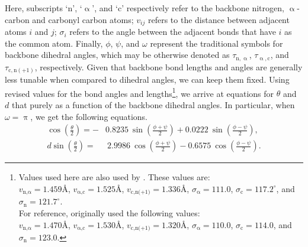 \documentclass[fleqn,10pt]{wlpeerj} %
\begin{document}
Here, subscripts `$\textrm{n}$', `$\upalpha$', and `$\textrm{c}$' respectively refer to the backbone nitrogen, $\upalpha$-carbon and carbonyl carbon atoms; $v_{ij}$ refers to the distance between adjacent atoms $i$ and $j$; $\sigma_i$ refers to the angle between the adjacent bonds that have $i$ as the common atom. Finally, $\phi$, $\psi$, and $\omega$ represent the traditional  symbols for backbone dihedral angles, which may be otherwise denoted as $\tau_{\textrm{n},\upalpha}$, $\tau_{\upalpha,\textrm{c}}$, and $\tau_{\textrm{c},\textrm{n}(+1)}$, respectively. Given that backbone bond lengths and angles are generally less tunable when compared to dihedral angles, we can keep them fixed. Using revised values for the bond angles and lengths\footnote{Values used here are also used by \cite{Zacharias2013}. These values are: \\%
$v_{\textrm{n,}\upalpha} = 1.459\textrm{\AA}$,\hfill
$v_{\upalpha\textrm{,c}} = 1.525\textrm{\AA}$, \hfill
$v_\textrm{c,n(+1)} = 1.336\textrm{\AA}$, \hfill
$\sigma_\upalpha = 111.0$,\hfill
$\sigma_\textrm{c} = 117.2^\circ$, \hfill and \hfill
$\sigma_\textrm{n} = 121.7^\circ$. \hfill \\
For reference, \cite{Miyazawa1961} originally used the following values:\\ 
$v_{\textrm{n,}\upalpha} = 1.470\textrm{\AA}$,\hfill
$v_{\upalpha\textrm{,c}} = 1.530\textrm{\AA}$,\hfill 
$v_\textrm{c,n(+1)} = 1.320\textrm{\AA}$, \hfill
$\sigma_\upalpha = 110.0$,\hfill
$\sigma_\textrm{c} = 114.0$, \hfill and \hfill
$\sigma_\textrm{n} = 123.0$.}, 
we arrive at equations for $\theta$ and $d$ that purely as a function of the backbone dihedral angles. In particular, when $\omega=\uppi$, we get the following equations.
\begin{align}
\label{eqn:theta_trans}
\cos\left(\frac{\theta}{2}\right) =-&0.8235~\sin\left(\frac{\phi+\psi}{2}\right) 
                                    +0.0222~\sin\left(\frac{\phi-\psi}{2}\right),\\
\label{eqn:d_trans}
d \sin\left(\frac{\theta}{2}\right) =&~2.9986~\cos\left(\frac{\phi+\psi}{2}\right)
                                      -0.6575~\cos\left(\frac{\phi-\psi}{2}\right).
\end{align}
\end{document}
